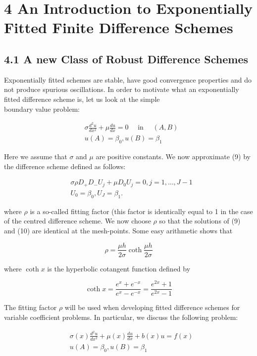 \documentclass[10pt]{article}
\begin{document}
\section*{4 An Introduction to Exponentially Fitted Finite Difference Schemes}
\subsection*{4.1 A new Class of Robust Difference Schemes}
Exponentially fitted schemes are stable, have good convergence properties and do not produce spurious oscillations. In order to motivate what an exponentially fitted difference scheme is, let us look at the simple\\
boundary value problem:


\begin{align*}
& \sigma \frac{d^{2} u}{d x^{2}}+\mu \frac{d u}{d x}=0 \quad \text { in } \quad(A, B)  \tag{9}\\
& u(A)=\beta_{0}, u(B)=\beta_{1}
\end{align*}


Here we assume that $\sigma$ and $\mu$ are positive constants. We now approximate (9) by the difference scheme defined as follows:


\begin{align*}
& \sigma \rho D_{+} D_{-} U_{j}+\mu D_{0} U_{j}=0, j=1, \ldots, J-1 \\
& U_{0}=\beta_{0}, U_{J}=\beta_{1} . \tag{10}
\end{align*}


where $\rho$ is a so-called fitting factor (this factor is identically equal to 1 in the case of the centred difference scheme. We now choose $\rho$ so that the solutions of (9) and (10) are identical at the mesh-points. Some easy arithmetic shows that

$$
\rho=\frac{\mu h}{2 \sigma} \operatorname{coth} \frac{\mu h}{2 \sigma}
$$

where $\operatorname{coth} x$ is the hyperbolic cotangent function defined by

$$
\operatorname{coth} x=\frac{e^{x}+e^{-x}}{e^{x}-e^{-x}}=\frac{e^{2 x}+1}{e^{2 x}-1}
$$

The fitting factor $\rho$ will be used when developing fitted difference schemes for variable coefficient problems. In particular, we discuss the following problem:


\begin{align*}
& \sigma(x) \frac{d^{2} u}{d x^{2}}+\mu(x) \frac{d u}{d x}+b(x) u=f(x)  \tag{11}\\
& u(A)=\beta_{0}, u(B)=\beta_{1}
\end{align*}
\end{document}
